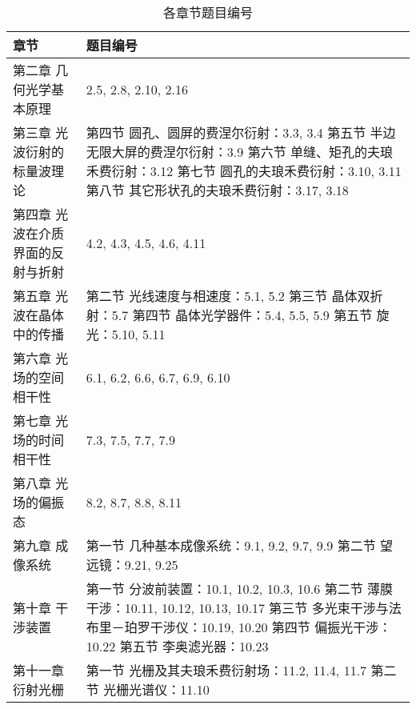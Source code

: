 \documentclass[a4paper]{article}
\begin{document}
\begin{table}[htbp]
\caption{各章节题目编号}
\centering
\renewcommand{\arraystretch}{1.2}
\begin{tabularx}{\textwidth}{@{}l|X@{}}
\toprule
章节 & 题目编号 \\
\midrule
第二章 几何光学基本原理 & 2.5, 2.8, 2.10, 2.16 \\
\midrule
第三章 光波衍射的标量波理论 & 
第四节 圆孔、圆屏的费涅尔衍射：3.3, 3.4 \newline
第五节 半边无限大屏的费涅尔衍射：3.9 \newline
第六节 单缝、矩孔的夫琅禾费衍射：3.12 \newline
第七节 圆孔的夫琅禾费衍射：3.10, 3.11 \newline
第八节 其它形状孔的夫琅禾费衍射：3.17, 3.18 \\
\midrule
第四章 光波在介质界面的反射与折射 & 4.2, 4.3, 4.5, 4.6, 4.11 \\
\midrule
第五章 光波在晶体中的传播 & 
第二节 光线速度与相速度：5.1, 5.2 \newline
第三节 晶体双折射：5.7 \newline
第四节 晶体光学器件：5.4, 5.5, 5.9 \newline
第五节 旋光：5.10, 5.11 \\
\midrule
第六章 光场的空间相干性 & 6.1, 6.2, 6.6, 6.7, 6.9, 6.10 \\
\midrule
第七章 光场的时间相干性 & 7.3, 7.5, 7.7, 7.9 \\
\midrule
第八章 光场的偏振态 & 8.2, 8.7, 8.8, 8.11 \\
\midrule
第九章 成像系统 & 
第一节 几种基本成像系统：9.1, 9.2, 9.7, 9.9 \newline
第二节 望远镜：9.21, 9.25 \\
\midrule
第十章 干涉装置 & 
第一节 分波前装置：10.1, 10.2, 10.3, 10.6 \newline
第二节 薄膜干涉：10.11, 10.12, 10.13, 10.17 \newline
第三节 多光束干涉与法布里－珀罗干涉仪：10.19, 10.20 \newline
第四节 偏振光干涉：10.22 \newline
第五节 李奥滤光器：10.23 \\
\midrule
第十一章 衍射光栅 & 
第一节 光栅及其夫琅禾费衍射场：11.2, 11.4, 11.7 \newline
第二节 光栅光谱仪：11.10 \\
\bottomrule
\end{tabularx}
\end{table}
\end{document}
